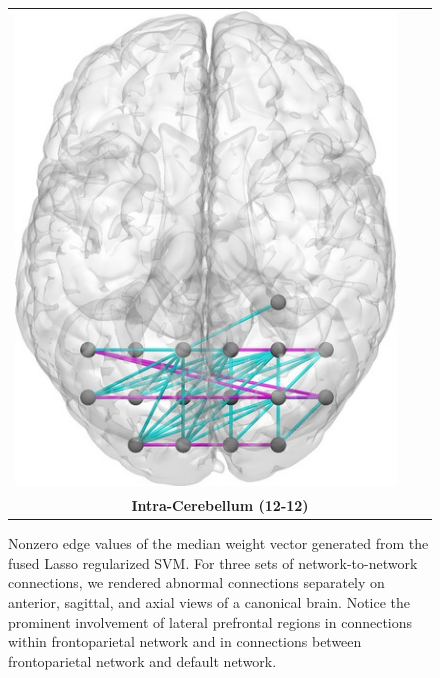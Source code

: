 \begin{figure}[ptbh]
\begin{tabular}{ccc}
		\includegraphics[height=\imheight]{12-12_superior_flas.jpg} \VSPACEE\\
		\multicolumn{3}{c}{\textbf{\large{Intra-Cerebellum (12-12)}}}  \\
	\end{tabular}
	\caption{
	Nonzero edge values of the median weight vector generated from the fused Lasso regularized SVM.  
	For three sets of network-to-network connections, we rendered abnormal connections separately on anterior, sagittal, and axial views of a canonical brain. 
	Notice the prominent involvement of lateral prefrontal regions in connections within frontoparietal network and in connections between frontoparietal network and default network.
	}
	\label{fig:bnv,median}
\end{figure}

